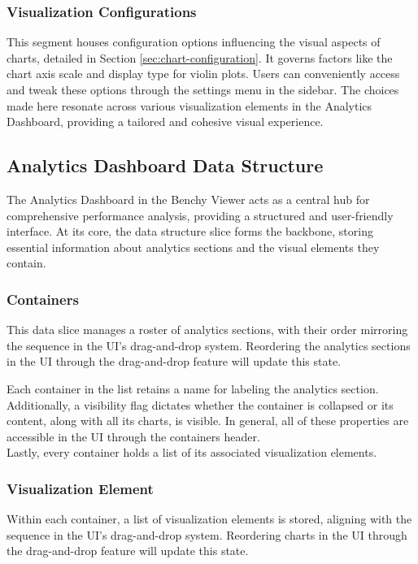 \subsubsection{Visualization Configurations}

This segment houses configuration options influencing the visual aspects of charts, detailed in Section \ref{sec:chart-configuration}. It governs factors like the chart axis scale and display type for violin plots. Users can conveniently access and tweak these options through the settings menu in the sidebar. The choices made here resonate across various visualization elements in the Analytics Dashboard, providing a tailored and cohesive visual experience.










\subsection{Analytics Dashboard Data Structure}\label{sec:analytics-dashboard}

The Analytics Dashboard in the Benchy Viewer acts as a central hub for comprehensive performance analysis, providing a structured and user-friendly interface. At its core, the data structure slice forms the backbone, storing essential information about analytics sections and the visual elements they contain.

\subsubsection{Containers}
This data slice manages a roster of analytics sections, with their order mirroring the sequence in the UI's drag-and-drop system. Reordering the analytics sections in the UI through the drag-and-drop feature will update this state.

Each container in the list retains a name for labeling the analytics section. Additionally, a visibility flag dictates whether the container is collapsed or its content, along with all its charts, is visible. In general, all of these properties are accessible in the UI through the containers header.\\
Lastly, every container holds a list of its associated visualization elements. 

\subsubsection{Visualization Element}
Within each container, a list of visualization elements is stored, aligning with the sequence in the UI's drag-and-drop system. Reordering charts in the UI through the drag-and-drop feature will update this state.

